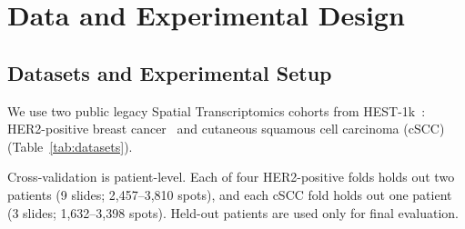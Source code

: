 \documentclass[]{spie}
\begin{document}
\section{Data and Experimental Design}
\label{sec:data}

\subsection{Datasets and Experimental Setup}
\label{sec:setup}

We use two public legacy Spatial Transcriptomics cohorts from HEST-1k~\cite{jaume2024hest}: HER2-positive breast cancer~\cite{andersson2021spatial} and cutaneous squamous cell carcinoma (cSCC)~\cite{ji2020multimodal} (Table~\ref{tab:datasets}).

\begin{table}[htbp]
\centering
\caption{Cohorts used in the conference benchmark. Counts reflect HEST-1k preprocessing.}
\label{tab:datasets}
\end{table}

Cross-validation is patient-level. Each of four HER2-positive folds holds out two patients (9 slides; 2,457--3,810 spots), and each cSCC fold holds out one patient (3 slides; 1,632--3,398 spots). Held-out patients are used only for final evaluation.
\end{document}
